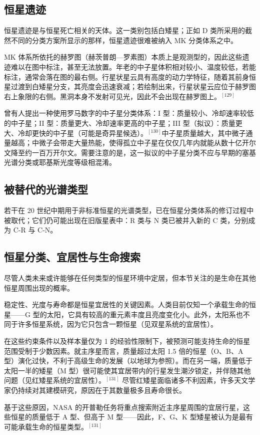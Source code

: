 \subsection{恒星遗迹}
恒星遗迹是与恒星死亡相关的天体。这一类别包括白矮星；正如 D 类所采用的截然不同的分类方案所显示的那样，恒星遗迹很难被纳入 MK 分类体系之中。

MK 体系所依托的赫罗图（赫茨普朗—罗素图）本质上是观测型的，因此这些遗迹难以在图中标注，甚至无法放置。年老的中子星体积相对较小、温度较低，若能标注，通常会落在图的最右侧。行星状星云具有高度的动力学特征，随着其前身恒星过渡到白矮星分支，其亮度会迅速衰减；若绘制出来，行星状星云应位于赫罗图右上象限的右侧。黑洞本身不发射可见光，因此不会出现在赫罗图上。$^{[129]}$

曾有人提出一种使用罗马数字的中子星分类体系：I 型：质量较小、冷却速率较低的中子星；II 型：质量更大、冷却速率更高的中子星；III 型（拟议）：质量更大、冷却更快的中子星（可能是奇异星候选）。$^{[130]}$中子星质量越大，其中微子通量越高；中微子会带走大量热能，使得孤立中子星在仅仅几年内就能从数十亿开尔文降至约一百万开尔文。需要注意的是，这一拟议的中子星分类不应与早期的塞基光谱分类或耶基斯光度等级相混淆。
\subsection{被替代的光谱类型}
若干在 20 世纪中期用于非标准恒星的光谱类型，已在恒星分类体系的修订过程中被取代；它们仍可能出现在旧版星表中：R 类与 N 类已被并入新的 C 类，分别成为 C-R 与 C-N。
\subsection{恒星分类、宜居性与生命搜索}
尽管人类未来或许能够在任何类型的恒星环境中定居，但本节关注的是生命在其他恒星周围出现的概率。

稳定性、光度与寿命都是恒星宜居性的关键因素。人类目前仅知一个承载生命的恒星——G 型的太阳，它具有较高的重元素丰度且亮度变化小。此外，太阳系也不同于许多恒星系统，因为它只包含一颗恒星（见双星系统的宜居性）。

在这些约束条件以及样本量仅为 1 的经验性限制下，被预测可能支持生命的恒星范围受制于少数因素。就主序星而言，质量超过太阳 1.5 倍的恒星（O、B、A 型）演化过快，不利于高级生命的发展（以地球为参照）。而在另一端，质量低于太阳一半的矮星（M 型）很可能使其宜居带内的行星发生潮汐锁定，并伴随其他问题（见红矮星系统的宜居性）。$^{[131]}$ 尽管红矮星面临诸多不利因素，许多天文学家仍持续对其建模研究，原因在于其数量极多且寿命很长。

基于这些原因，NASA 的开普勒任务将重点搜索附近主序星周围的宜居行星，这些恒星的质量低于 A 型、但高于 M 型——因此，F、G、K 型矮星被认为是最有可能承载生命的恒星类型。$^{[131]}$
